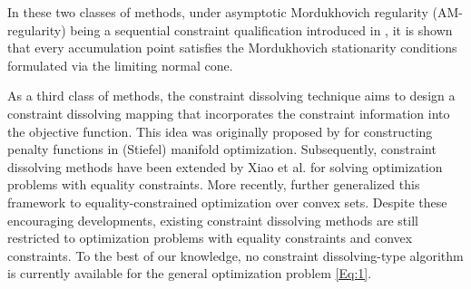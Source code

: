 \documentclass[11pt,a4paper,reqno]{amsart}
\begin{document}
{ 
In these two classes of methods, under asymptotic Mordukhovich regularity (AM-regularity) being a sequential constraint qualification introduced in \cite{mehlitz2020asymptotic}, it is shown that every accumulation point satisfies the Mordukhovich stationarity conditions formulated via the limiting normal cone.

As a third class of methods, the constraint dissolving technique aims to design a constraint dissolving mapping that incorporates the constraint information into the objective function. This idea was originally proposed by \cite{xiao2024solving} for constructing penalty functions in (Stiefel) manifold optimization. Subsequently, constraint dissolving methods have been extended by Xiao et al. \cite{hu2024constraint,xiao2024dissolving} for solving optimization problems with equality constraints. More recently, \cite{xiao2026exact} further generalized this framework to equality-constrained optimization over convex sets. Despite these encouraging developments, existing constraint dissolving methods are still restricted to optimization problems with equality constraints and convex constraints. To the best of our knowledge, no constraint dissolving-type algorithm is currently available for the general optimization problem \eqref{Eq:1}. %

}
\end{document}
